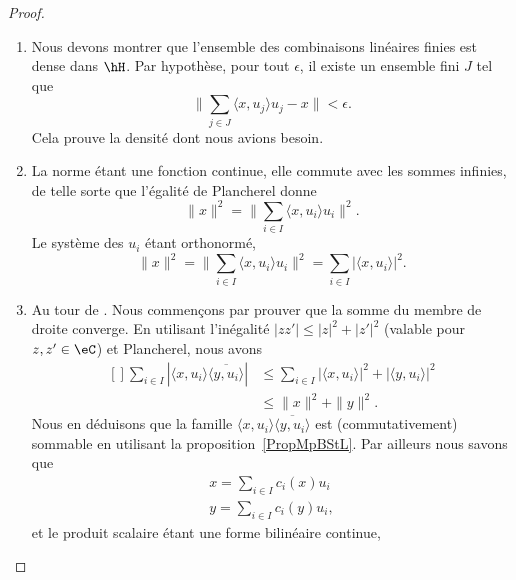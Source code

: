 \begin{proof}
\begin{enumerate}
		\item
		      Nous devons montrer que l'ensemble des combinaisons linéaires finies est dense dans \( \hH\). Par hypothèse, pour tout \( \epsilon\), il existe un ensemble fini \( J\) tel que
		      \begin{equation}
			      \| \sum_{j\in J}\langle x, u_j\rangle u_j-x \|<\epsilon.
		      \end{equation}
		      Cela prouve la densité dont nous avions besoin.
		\item
		      La norme étant une fonction continue, elle commute avec les sommes infinies, de telle sorte que l'égalité de Plancherel donne
		      \begin{equation}
			      \| x \|^2=\| \sum_{i\in I}\langle x, u_i\rangle u_i \|^2.
		      \end{equation}
		      Le système des \( u_i\) étant orthonormé,
		      \begin{equation}
			      \| x \|^2=\| \sum_{i\in I}\langle x, u_i\rangle u_i \|^2=\sum_{i\in I}| \langle x, u_i\rangle  |^2.
		      \end{equation}
		\item
		      Au tour de . Nous commençons par prouver que la somme du membre de droite converge. En utilisant l'inégalité \( | zz' |\leq | z |^2+| z' |^2\) (valable pour \( z,z'\in \eC\)) et Plancherel, nous avons
		      \begin{equation}
			      \begin{aligned}[]
				      \sum_{i\in I}| \langle x, u_i\rangle \overline{ \langle y, u_i\rangle  } | & \leq\sum_{i\in I}| \langle x, u_i\rangle  |^2+| \langle y, u_i\rangle  |^2 \\
				                                                                                 & \leq \| x \|^2+\| y \|^2.
			      \end{aligned}
		      \end{equation}
		      Nous en déduisons que la famille \( \langle x, u_i\rangle \overline{ \langle y, u_i\rangle  }\) est (commutativement) sommable en utilisant la proposition~\ref{PropMpBStL}. Par ailleurs nous savons que
		      \begin{subequations}
			      \begin{align}
				      x=\sum_{i\in I}c_i(x)u_i \\
				      y=\sum_{i\in I}c_i(y)u_i,
			      \end{align}
		      \end{subequations}
		      et le produit scalaire étant une forme bilinéaire continue,

\end{enumerate}
\end{proof}
